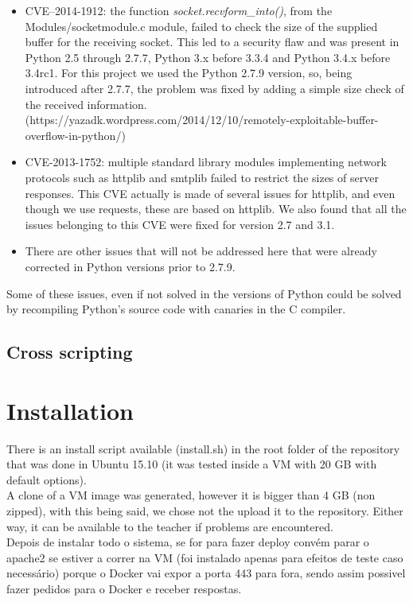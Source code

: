\documentclass[11pt,a4paper]{report}
\begin{document}
\begin{itemize}
    \item CVE–2014-1912: the function \emph{socket.recvform\_into()}, from the Modules/socketmodule.c module, failed to check the size of the supplied buffer for the receiving socket. This led to a security flaw and was present in Python 2.5 through 2.7.7, Python 3.x before 3.3.4 and Python 3.4.x before 3.4rc1. For this project we used the Python 2.7.9 version, so, being introduced after 2.7.7, the problem was fixed by adding a simple size check of the received information. (https://yazadk.wordpress.com/2014/12/10/remotely-exploitable-buffer-overflow-in-python/)
 \item CVE-2013-1752: multiple standard library modules implementing network protocols such as httplib and smtplib failed to restrict the sizes of server responses. This CVE actually is made of several issues for httplib, and even though we use requests, these are based on httplib. We also found that all the issues belonging to this CVE were fixed for version 2.7 and 3.1.
 \item There are other issues that will not be addressed here that were already corrected in Python versions prior to 2.7.9.
\end{itemize}

Some of these issues, even if not solved in the versions of Python could be solved by recompiling Python’s source code with canaries in the C compiler.

\section{Cross scripting}

\chapter{Installation}

There is an install script available (install.sh) in the root folder of the repository that was done in Ubuntu 15.10 (it was tested inside a VM with 20 GB with default options).\\

A clone of a VM image was generated, however it is bigger than 4 GB (non zipped), with this being said, we chose not the upload it to the repository. Either way, it can be available to the teacher if problems are encountered.\\

Depois de instalar todo o sistema, se for para fazer deploy convém parar o apache2 se estiver a correr na VM (foi instalado apenas para efeitos de teste caso necessário) porque o Docker vai expor a porta 443 para fora, sendo assim possivel fazer pedidos para o Docker e receber respostas.\\
\end{document}
